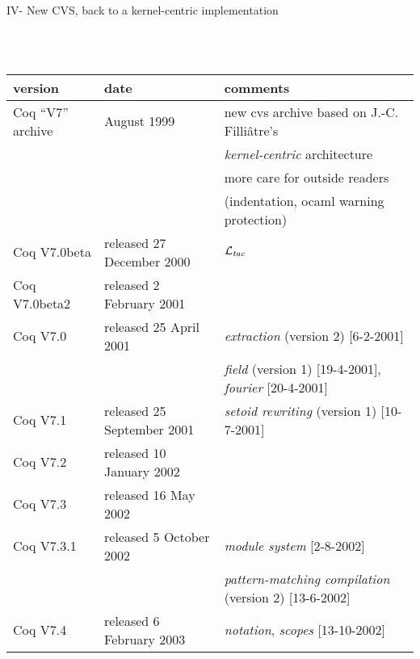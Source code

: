 \documentclass[a4paper]{book}
\newcommand{\feature}[1]{{\em #1}}
\begin{document}
\newpage
\centerline{IV- New CVS, back to a kernel-centric implementation}
\mbox{}\\
\mbox{}\\
\begin{tabular}{l|l|l}
version & date & comments \\
\hline
Coq ``V7'' archive & August 1999 & new cvs archive based on J.-C. Filliâtre's \\
   & & \feature{kernel-centric} architecture \\
   & & more care for outside readers\\
   & & (indentation, ocaml warning protection)\\
Coq V7.0beta& released 27 December 2000 & \feature{${\cal L}_{\mathit{tac}}$} \\
Coq V7.0beta2& released 2 February 2001\\

Coq V7.0& released 25 April 2001 & \feature{extraction} (version 2) [6-2-2001] \\
  & & \feature{field} (version 1) [19-4-2001], \feature{fourier} [20-4-2001] \\

Coq V7.1& released 25 September 2001 & \feature{setoid rewriting} (version 1) [10-7-2001]\\

Coq V7.2& released 10 January 2002\\

Coq V7.3& released 16 May 2002\\

Coq V7.3.1& released 5 October 2002 & \feature{module system} [2-8-2002]\\
  & & \feature{pattern-matching compilation} (version 2) [13-6-2002]\\

Coq V7.4& released 6 February 2003 & \feature{notation}, \feature{scopes} [13-10-2002]\\
\end{tabular}

\medskip
\bigskip
\end{document}
